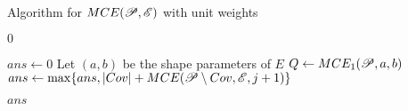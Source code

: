 \begin{algoritmo}
    \caption{Algorithm for $MCE(\mathscr{P}, \mathscr{E})$ with unit weights}\label{algoritmo:mce}
    \begin{algorithmic}[1]
        
        \item[]
        
        \State \Return $0$
        \EndIf
        
        \State $ans \gets 0$
        \State Let $(a,b)$ be the shape parameters of $E$
        \State $Q \gets MCE_1(\mathscr{P}, a, b)$
        \State $ans \gets \max\{ans, |Cov| + MCE(\mathscr{P} \setminus Cov, \mathscr{E}, j+1)\}$ 
        \EndFor
        \EndFor
        
        \State \Return $ans$
        \EndProcedure
    \end{algorithmic}
\end{algoritmo}